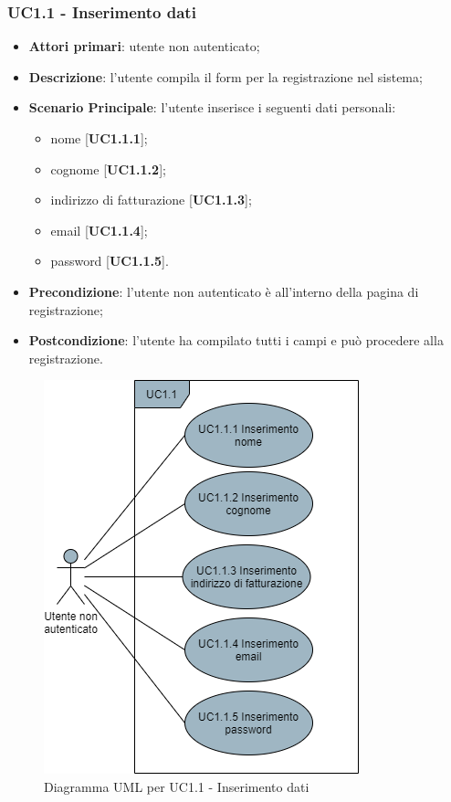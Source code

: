 \subsubsection{UC1.1 - Inserimento dati}
\begin{itemize}
\item \textbf{Attori primari}: utente non autenticato;
\item \textbf{Descrizione}: l'utente compila il form per la registrazione nel sistema;
\item \textbf{Scenario Principale}: l'utente inserisce i seguenti dati personali:
\begin{itemize}
\item nome [\textbf{UC1.1.1}];
\item cognome [\textbf{UC1.1.2}];
\item indirizzo di fatturazione [\textbf{UC1.1.3}];
\item email [\textbf{UC1.1.4}];
\item password [\textbf{UC1.1.5}].
\end{itemize}
\item \textbf{Precondizione}: l'utente non autenticato è all'interno della pagina di registrazione;
\item \textbf{Postcondizione}: l'utente ha compilato tutti i campi e può procedere alla registrazione.
\end{itemize}

\begin{figure}[H]
\centering
\includegraphics[scale=0.6]{res/UseCase/Immagini/InserimentoDatiRegistrazione}
\caption{Diagramma UML per UC1.1 - Inserimento dati}
\end{figure}


